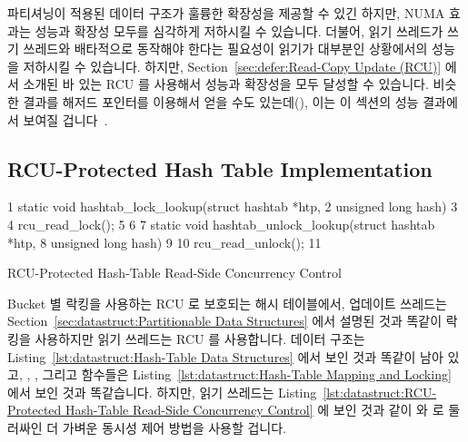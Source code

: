 파티셔닝이 적용된 데이터 구조가 훌륭한 확장성을 제공할 수 있긴 하지만, NUMA
효과는 성능과 확장성 모두를 심각하게 저하시킬 수 있습니다.
더불어, 읽기 쓰레드가 쓰기 쓰레드와 배타적으로 동작해야 한다는 필요성이 읽기가
대부분인 상황에서의 성능을 저하시킬 수 있습니다.
하지만,
Section~\ref{sec:defer:Read-Copy Update (RCU)} 에서 소개된 바 있는 RCU 를
사용해서 성능과 확장성을 모두 달성할 수 있습니다.
비슷한 결과를 해저드 포인터를 이용해서 얻을 수도 있는데(), 이는
이 섹션의 성능 결과에서 보여질 겁니다~\cite{McKenney:2013:SDS:2483852.2483867}.

\subsection{RCU-Protected Hash Table Implementation}
\label{sec:datastruct:RCU-Protected Hash Table Implementation}

\begin{listing}[tb]
{ \scriptsize
\begin{verbbox}
 1 static void hashtab_lock_lookup(struct hashtab *htp,
 2                                 unsigned long hash)
 3 {
 4   rcu_read_lock();
 5 }
 6 
 7 static void hashtab_unlock_lookup(struct hashtab *htp,
 8                                   unsigned long hash)
 9 {
10   rcu_read_unlock();
11 }
\end{verbbox}
}
\centering
\theverbbox
\caption{RCU-Protected Hash-Table Read-Side Concurrency Control}
\label{lst:datastruct:RCU-Protected Hash-Table Read-Side Concurrency Control}
\end{listing}

Bucket 별 락킹을 사용하는 RCU 로 보호되는 해시 테이블에서, 업데이트 쓰레드는
Section~\ref{sec:datastruct:Partitionable Data Structures} 에서 설명된 것과
똑같이 락킹을 사용하지만 읽기 쓰레드는 RCU 를 사용합니다.
데이터 구조는
Listing~\ref{lst:datastruct:Hash-Table Data Structures} 에서 보인 것과 똑같이
남아 있고,
, , 그리고  함수들은
Listing~\ref{lst:datastruct:Hash-Table Mapping and Locking} 에서 보인 것과
똑같습니다.
하지만, 읽기 쓰레드는
Listing~\ref{lst:datastruct:RCU-Protected Hash-Table Read-Side Concurrency Control}
에 보인 것과 같이
 와  로 둘러싸인 더
가벼운 동시성 제어 방법을 사용할 겁니다.
\iffalse

